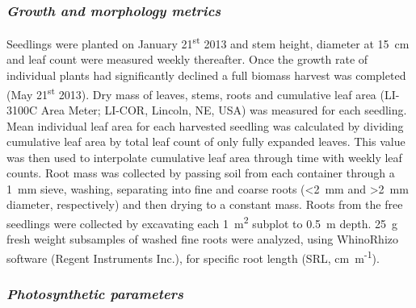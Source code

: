 \documentclass[a4paper]{article}\usepackage[]{graphicx}\usepackage[]{color}
\begin{document}
\subsubsection*{\textit{Growth and morphology metrics}}

Seedlings were planted on January 21\textsuperscript{st} 2013 and stem height, diameter at 15~cm and leaf count were measured weekly thereafter. Once the growth rate of individual plants had significantly declined a full biomass harvest was completed (May 21\textsuperscript{st} 2013). Dry mass of leaves, stems, roots and cumulative leaf area (LI-3100C Area Meter; LI-COR, Lincoln, NE, USA) was measured for each seedling. Mean individual leaf area for each harvested seedling was calculated by dividing cumulative leaf area by total leaf count of only fully expanded leaves. This value was then used to interpolate cumulative leaf area through time with weekly leaf counts. Root mass was collected by passing soil from each container through a 1~mm sieve, washing, separating into fine and coarse roots (\textless2~mm and \textgreater2~mm diameter, respectively) and then drying to a constant mass. Roots from the free seedlings were collected by excavating each 1~m\textsuperscript{2} subplot to 0.5~m depth.  25~g fresh weight subsamples of washed fine roots were analyzed, using WhinoRhizo software (Regent Instruments Inc.), for specific root length (SRL, cm~m\textsuperscript{-1}).

\subsubsection*{\textit{Photosynthetic parameters}}
\end{document}
